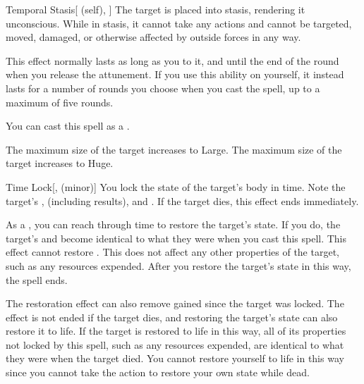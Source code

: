 \lowercase{\hypertarget{spell:Temporal Stasis}{}}\label{spell:Temporal Stasis}
\begin{attuneability}[Rank 4]{\hypertarget{spell:Temporal Stasis}{Temporal Stasis}}[ (self), ]
The target is placed into stasis, rendering it unconscious.
While in stasis, it cannot take any actions and cannot be targeted, moved, damaged, or otherwise affected by outside forces in any way.

This effect normally lasts as long as you  to it, and until the end of the round when you release the attunement.
If you use this ability on yourself, it instead lasts for a number of rounds you choose when you cast the spell, up to a maximum of five rounds.

You can cast this spell as a .

\rankline
{} The maximum size of the target increases to Large.
 The maximum size of the target increases to Huge.
\end{attuneability}
\vspace{0.25em}



\lowercase{\hypertarget{spell:Time Lock}{}}\label{spell:Time Lock}
\begin{freeability}[Rank 4]{\hypertarget{spell:Time Lock}{Time Lock}}[,  (minor)]
You lock the state of the target's body in time.
Note the target's ,  (including  results), and .
If the target dies, this effect ends immediately.

As a , you can reach through time to restore the target's state.
If you do, the target's  and  become identical to what they were when you cast this spell.
This effect cannot restore .
This does not affect any other properties of the target, such as any resources expended.
After you restore the target's state in this way, the spell ends.

\rankline
{} The restoration effect can also remove  gained since the target was locked.
 The effect is not ended if the target dies, and restoring the target's state can also restore it to life.
If the target is restored to life in this way, all of its properties not locked by this spell, such as any resources expended, are identical to what they were when the target died.
You cannot restore yourself to life in this way since you cannot take the action to restore your own state while dead.
\end{freeability}
\vspace{0.25em}



